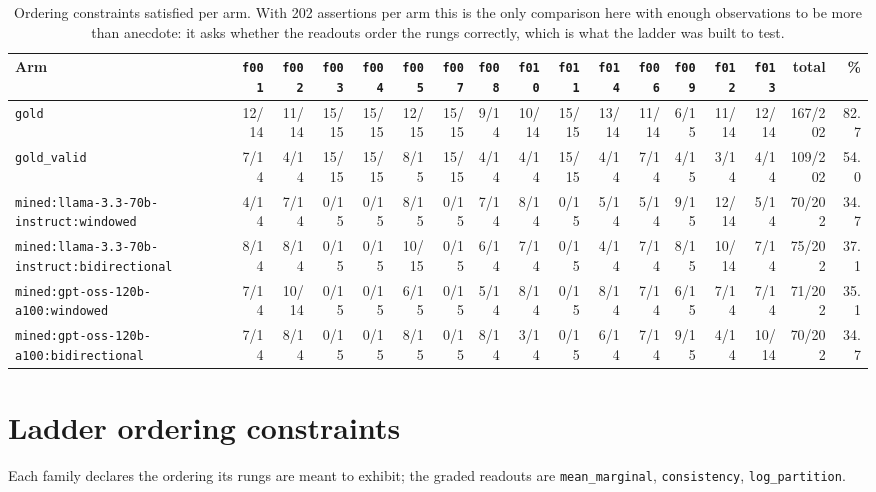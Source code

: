 \documentclass[11pt]{article}
\begin{document}
\begin{table}[htbp]
\centering
\small
\caption{Ordering constraints satisfied per arm. With 202 assertions per arm this is the only comparison here with enough observations to be more than anecdote: it asks whether the readouts order the rungs correctly, which is what the ladder was built to test.}
\label{tab:ladder-by-arm}
\begin{tabular}{lrrrrrrrrrrrrrrrr}
\toprule
Arm & \texttt{f001} & \texttt{f002} & \texttt{f003} & \texttt{f004} & \texttt{f005} & \texttt{f007} & \texttt{f008} & \texttt{f010} & \texttt{f011} & \texttt{f014} & \texttt{f006} & \texttt{f009} & \texttt{f012} & \texttt{f013} & total & \% \\
\midrule
\texttt{gold} & 12/14 & 11/14 & 15/15 & 15/15 & 12/15 & 15/15 & 9/14 & 10/14 & 15/15 & 13/14 & 11/14 & 6/15 & 11/14 & 12/14 & 167/202 & 82.7 \\
\texttt{gold\_valid} & 7/14 & 4/14 & 15/15 & 15/15 & 8/15 & 15/15 & 4/14 & 4/14 & 15/15 & 4/14 & 7/14 & 4/15 & 3/14 & 4/14 & 109/202 & 54.0 \\
\texttt{mined:llama-3.3-70b-instruct:windowed} & 4/14 & 7/14 & 0/15 & 0/15 & 8/15 & 0/15 & 7/14 & 8/14 & 0/15 & 5/14 & 5/14 & 9/15 & 12/14 & 5/14 & 70/202 & 34.7 \\
\texttt{mined:llama-3.3-70b-instruct:bidirectional} & 8/14 & 8/14 & 0/15 & 0/15 & 10/15 & 0/15 & 6/14 & 7/14 & 0/15 & 4/14 & 7/14 & 8/15 & 10/14 & 7/14 & 75/202 & 37.1 \\
\texttt{mined:gpt-oss-120b-a100:windowed} & 7/14 & 10/14 & 0/15 & 0/15 & 6/15 & 0/15 & 5/14 & 8/14 & 0/15 & 8/14 & 7/14 & 6/15 & 7/14 & 7/14 & 71/202 & 35.1 \\
\texttt{mined:gpt-oss-120b-a100:bidirectional} & 7/14 & 8/14 & 0/15 & 0/15 & 8/15 & 0/15 & 8/14 & 3/14 & 0/15 & 6/14 & 7/14 & 9/15 & 4/14 & 10/14 & 70/202 & 34.7 \\
\bottomrule
\end{tabular}
\end{table}

\section{Ladder ordering constraints}\label{sec:ladder}

Each family declares the ordering its rungs are meant to exhibit; the graded readouts are \texttt{mean\_marginal}, \texttt{consistency}, \texttt{log\_partition}.
\end{document}
